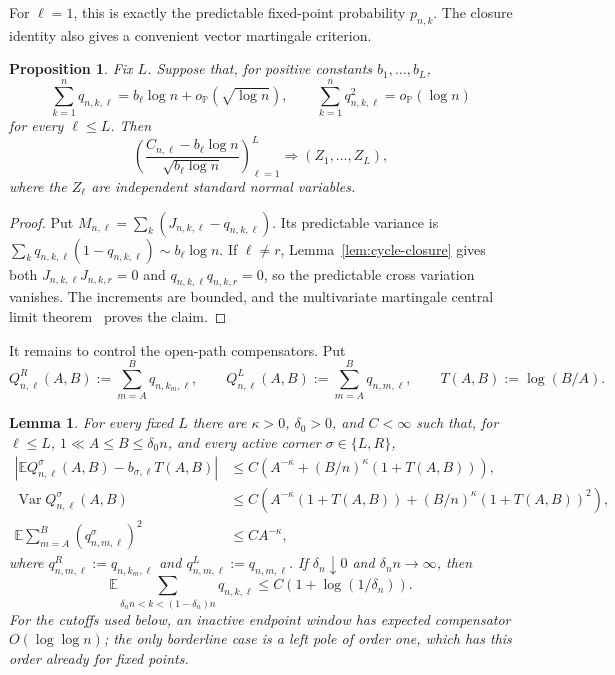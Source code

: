 \documentclass[11pt]{article}
\newtheorem{proposition}[theorem]{Proposition}
\newtheorem{lemma}[theorem]{Lemma}
\theoremstyle{remark}
\theoremstyle{plain}
\newcommand{\E}{\mathbb E}
\newcommand{\Pp}{\mathbb P}
\newcommand{\Var}{\operatorname{Var}}
\begin{document}
For $\ell=1$, this is exactly the predictable fixed-point probability
$p_{n,k}$.  The closure identity also gives a convenient vector martingale
criterion.

\begin{proposition}\label{prop:vector-closure-clt}
Fix $L$.  Suppose that, for positive constants $b_1,\ldots,b_L$,
\begin{equation}\label{eq:vector-closure-input}
 \sum_{k=1}^nq_{n,k,\ell}
 =b_\ell\log n+o_{\Pp}(\sqrt{\log n}),
 \qquad
 \sum_{k=1}^nq_{n,k,\ell}^2=o_{\Pp}(\log n)
\end{equation}
for every $\ell\le L$.  Then
\[
 \left(
 \frac{C_{n,\ell}-b_\ell\log n}{\sqrt{b_\ell\log n}}
 \right)_{\ell=1}^L
 \Longrightarrow (Z_1,\ldots,Z_L),
\]
where the $Z_\ell$ are independent standard normal variables.
\end{proposition}

\begin{proof}
Put
$M_{n,\ell}=\sum_k(J_{n,k,\ell}-q_{n,k,\ell})$.
Its predictable variance is
$\sum_kq_{n,k,\ell}(1-q_{n,k,\ell})\sim b_\ell\log n$.
If $\ell\ne r$, Lemma~\ref{lem:cycle-closure} gives both
$J_{n,k,\ell}J_{n,k,r}=0$ and
$q_{n,k,\ell}q_{n,k,r}=0$, so the predictable cross variation vanishes.
The increments are bounded, and the multivariate martingale central limit
theorem~\cite{hall1980martingale} proves the claim.
\end{proof}

It remains to control the open-path compensators.  Put
\[
 Q^R_{n,\ell}(A,B):=\sum_{m=A}^Bq_{n,k_m,\ell},
 \qquad
 Q^L_{n,\ell}(A,B):=\sum_{m=A}^Bq_{n,m,\ell},
 \qquad T(A,B):=\log(B/A).
\]

\begin{lemma}\label{lem:power-two-path}
For every fixed $L$ there are $\kappa>0$, $\delta_0>0$, and $C<\infty$ such
that, for $\ell\le L$, $1\ll A\le B\le\delta_0n$, and every active corner
$\sigma\in\{L,R\}$,
\begin{align}
 \left|\E Q^\sigma_{n,\ell}(A,B)-b_{\sigma,\ell}T(A,B)\right|
 &\le C\left(A^{-\kappa}+(B/n)^\kappa(1+T(A,B))\right),
 \label{eq:path-first-moment}\\
 \Var Q^\sigma_{n,\ell}(A,B)
 &\le C\left(A^{-\kappa}(1+T(A,B))
 +(B/n)^\kappa(1+T(A,B))^2\right),
 \label{eq:path-second-moment}\\
 \E\sum_{m=A}^B(q^\sigma_{n,m,\ell})^2&\le CA^{-\kappa},
 \label{eq:path-square-bound}
\end{align}
where $q^R_{n,m,\ell}:=q_{n,k_m,\ell}$ and
$q^L_{n,m,\ell}:=q_{n,m,\ell}$.  If $\delta_n\downarrow0$ and
$\delta_n n\to\infty$, then
\begin{equation}\label{eq:path-outer}
 \E\sum_{\delta_n n<k<(1-\delta_n)n}q_{n,k,\ell}
 \le C(1+\log(1/\delta_n)).
\end{equation}
For the cutoffs used below, an inactive endpoint window has expected
compensator $O(\log\log n)$; the only borderline case is a left pole of
order one, which has this order already for fixed points.
\end{lemma}
\end{document}
